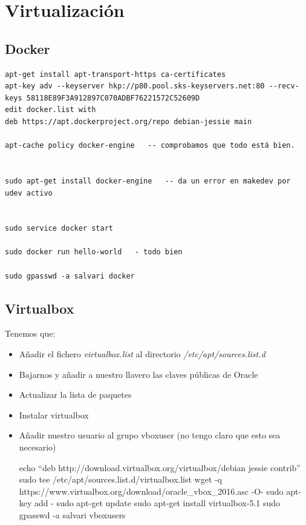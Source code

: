 \documentclass[12pt,spanish,]{article}
\begin{document}
\section{Virtualización}\label{virtualizaciuxf3n}

\subsection{Docker}\label{docker}

\begin{verbatim}
apt-get install apt-transport-https ca-certificates
apt-key adv --keyserver hkp://p80.pool.sks-keyservers.net:80 --recv-keys 58118E89F3A912897C070ADBF76221572C52609D
edit docker.list with
deb https://apt.dockerproject.org/repo debian-jessie main

apt-cache policy docker-engine   -- comprobamos que todo está bien.


sudo apt-get install docker-engine   -- da un error en makedev por udev activo


sudo service docker start

sudo docker run hello-world   - todo bien

sudo gpasswd -a salvari docker
\end{verbatim}

\subsection{Virtualbox}\label{virtualbox}

Tenemos que:

\begin{itemize}
\item
  Añadir el fichero \emph{virtualbox.list} al directorio
  \emph{/etc/apt/sources.list.d}
\item
  Bajarnos y añadir a nuestro llavero las claves públicas de Oracle
\item
  Actualizar la lista de paquetes
\item
  Instalar virtualbox
\item
  Añadir nuestro usuario al grupo vboxuser (no tengo claro que esto sea
  necesario)

  echo ``deb http://download.virtualbox.org/virtualbox/debian jessie
  contrib'' \textbar{}sudo tee /etc/apt/sources.list.d/virtualbox.list
  wget -q https://www.virtualbox.org/download/oracle\_vbox\_2016.asc -O-
  \textbar{} sudo apt-key add - sudo apt-get update sudo apt-get install
  virtualbox-5.1 sudo gpasswd -a salvari vboxusers
\end{itemize}
\end{document}

